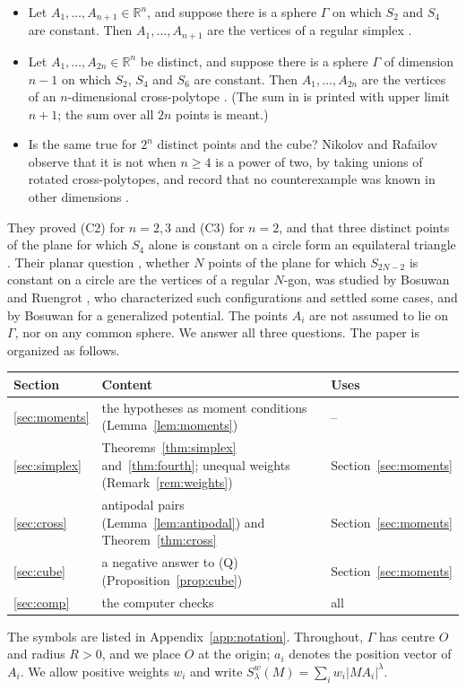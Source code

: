 \documentclass[11pt]{article}
\theoremstyle{remark}
\begin{document}
\begin{itemize}
\item[\textbf{(C2)}] Let $A_1,\dots,A_{n+1}\in\mathbb{R}^n$, and suppose there is a sphere $\Gamma$ on which $S_2$ and $S_4$ are constant. Then $A_1,\dots,A_{n+1}$ are the vertices of a regular simplex \cite[Conjecture~2]{NR}.
\item[\textbf{(C3)}] Let $A_1,\dots,A_{2n}\in\mathbb{R}^n$ be distinct, and suppose there is a sphere $\Gamma$ of dimension $n-1$ on which $S_2$, $S_4$ and $S_6$ are constant. Then $A_1,\dots,A_{2n}$ are the vertices of an $n$-dimensional cross-polytope \cite[Conjecture~3]{NR}. (The sum in \cite{NR} is printed with upper limit $n+1$; the sum over all $2n$ points is meant.)
\item[\textbf{(Q)}] Is the same true for $2^n$ distinct points and the cube? Nikolov and Rafailov observe that it is not when $n\ge4$ is a power of two, by taking unions of rotated cross-polytopes, and record that no counterexample was known in other dimensions \cite[Section~6.3]{NR}.
\end{itemize}

They proved (C2) for $n=2,3$ and (C3) for $n=2$, and that three distinct points of the plane for which $S_4$ alone is constant on a circle form an equilateral triangle \cite[Proposition~2]{NR}. Their planar question \cite[Conjecture~1]{NR}, whether $N$ points of the plane for which $S_{2N-2}$ is constant on a circle are the vertices of a regular $N$-gon, was studied by Bosuwan and Ruengrot \cite{BosuwanRuengrot}, who characterized such configurations and settled some cases, and by Bosuwan \cite{Bosuwan} for a generalized potential. The points $A_i$ are not assumed to lie on $\Gamma$, nor on any common sphere. We answer all three questions. The paper is organized as follows.
\begin{center}
\begin{tabular}{lp{9.2cm}l}
\toprule
Section & Content & Uses\\
\midrule
\ref{sec:moments} & the hypotheses as moment conditions (Lemma~\ref{lem:moments}) & --\\
\ref{sec:simplex} & Theorems~\ref{thm:simplex} and~\ref{thm:fourth}; unequal weights (Remark~\ref{rem:weights}) & Section~\ref{sec:moments}\\
\ref{sec:cross} & antipodal pairs (Lemma~\ref{lem:antipodal}) and Theorem~\ref{thm:cross} & Section~\ref{sec:moments}\\
\ref{sec:cube} & a negative answer to (Q) (Proposition~\ref{prop:cube}) & Section~\ref{sec:moments}\\
\ref{sec:comp} & the computer checks & all\\
\bottomrule
\end{tabular}
\end{center}
The symbols are listed in Appendix~\ref{app:notation}. Throughout, $\Gamma$ has centre $O$ and radius $R>0$, and we place $O$ at the origin; $a_i$ denotes the position vector of $A_i$. We allow positive weights $w_i$ and write $S_\lambda^w(M)=\sum_i w_i|MA_i|^\lambda$.
\end{document}
